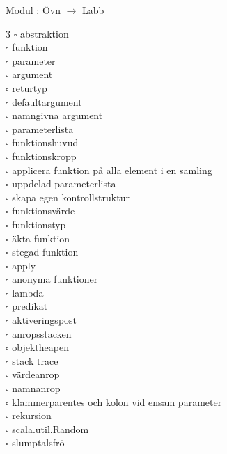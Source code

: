 
    Modul : Övn  $\rightarrow$ Labb 
    \begin{multicols}{3}\SlideFontTiny
    $\square$ abstraktion \\
$\square$ funktion \\
$\square$ parameter \\
$\square$ argument \\
$\square$ returtyp \\
$\square$ defaultargument \\
$\square$ namngivna argument \\
$\square$ parameterlista \\
$\square$ funktionshuvud \\
$\square$ funktionskropp \\
$\square$ applicera funktion på alla element i en samling \\
$\square$ uppdelad parameterlista \\
$\square$ skapa egen kontrollstruktur \\
$\square$ funktionsvärde \\
$\square$ funktionstyp \\
$\square$ äkta funktion \\
$\square$ stegad funktion \\
$\square$ apply \\
$\square$ anonyma funktioner \\
$\square$ lambda \\
$\square$ predikat \\
$\square$ aktiveringspost \\
$\square$ anropsstacken \\
$\square$ objektheapen \\
$\square$ stack trace \\
$\square$ värdeanrop \\
$\square$ namnanrop \\
$\square$ klammerparentes och kolon vid ensam parameter \\
$\square$ rekursion \\
$\square$ scala.util.Random \\
$\square$ slumptalsfrö \\
    \end{multicols}
    